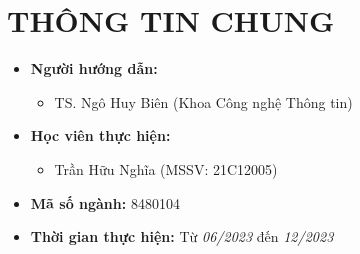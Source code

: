 \documentclass{article}[14pt]
\begin{document}
    \vspace{.5cm}
    
    \Large
    \section{THÔNG TIN CHUNG}
    \begin{itemize}[label = {}]
        
        \item \textbf{Người hướng dẫn:} 
        \begin{itemize}
            \item TS. Ngô Huy Biên (Khoa Công nghệ Thông tin)
        \end{itemize}{}
    
        
        \item \textbf{Học viên thực hiện:}
        
        \begin{itemize}
        
            \item Trần Hữu Nghĩa (MSSV: 21C12005) 
           
        \end{itemize}

        \item \textbf{Mã số ngành:} 8480104
        
        \item \textbf{Thời gian thực hiện:} Từ \textit{06/2023} đến \textit{12/2023}
        
        
    \end{itemize}
    
    \pagebreak 
\end{document}
